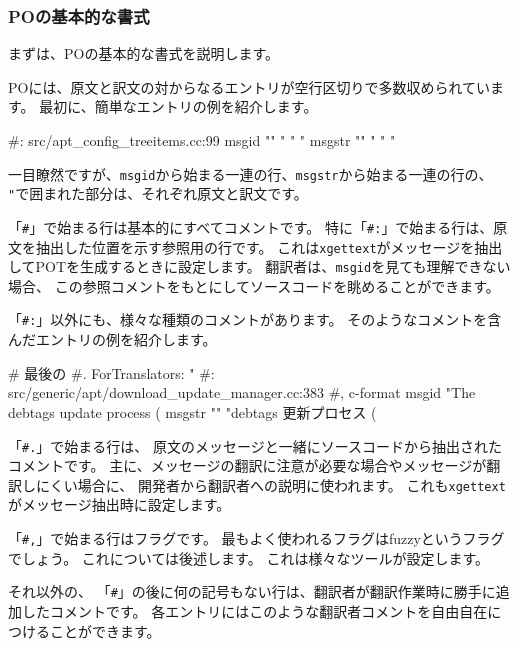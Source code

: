 \documentclass[mingoth,a4paper]{jsarticle}
\begin{document}
\subsubsection{POの基本的な書式}

まずは、POの基本的な書式を説明します。

POには、原文と訳文の対からなるエントリが空行区切りで多数収められています。
最初に、簡単なエントリの例を紹介します。

\begin{commandline}
#: src/apt_config_treeitems.cc:99
msgid ""
"%
"%
"%
msgstr ""
"%
"%
"%
\end{commandline}

一目瞭然ですが、\texttt{msgid}から始まる一連の行、\texttt{msgstr}から始まる一連の行の、
\texttt{"}で囲まれた部分は、それぞれ原文と訳文です。

「\texttt{\#}」で始まる行は基本的にすべてコメントです。
特に「\texttt{\#:}」で始まる行は、原文を抽出した位置を示す参照用の行です。
これは\texttt{xgettext}がメッセージを抽出してPOTを生成するときに設定します。
翻訳者は、\texttt{msgid}を見ても理解できない場合、
この参照コメントをもとにしてソースコードを眺めることができます。

「\texttt{\#:}」以外にも、様々な種類のコメントがあります。
そのようなコメントを含んだエントリの例を紹介します。

\begin{commandline}
# 最後の %
#. ForTranslators: "%
#: src/generic/apt/download_update_manager.cc:383
#, c-format
msgid "The debtags update process (%
msgstr ""
"debtags 更新プロセス (%
\end{commandline}

「\texttt{\#.}」で始まる行は、
原文のメッセージと一緒にソースコードから抽出されたコメントです。
主に、メッセージの翻訳に注意が必要な場合やメッセージが翻訳しにくい場合に、
開発者から翻訳者への説明に使われます。
これも\texttt{xgettext}がメッセージ抽出時に設定します。

「\texttt{\#,}」で始まる行はフラグです。
最もよく使われるフラグはfuzzyというフラグでしょう。
これについては後述します。
これは様々なツールが設定します。

それ以外の、
「\texttt{\#}」の後に何の記号もない行は、翻訳者が翻訳作業時に勝手に追加したコメントです。
各エントリにはこのような翻訳者コメントを自由自在につけることができます。
\end{document}
